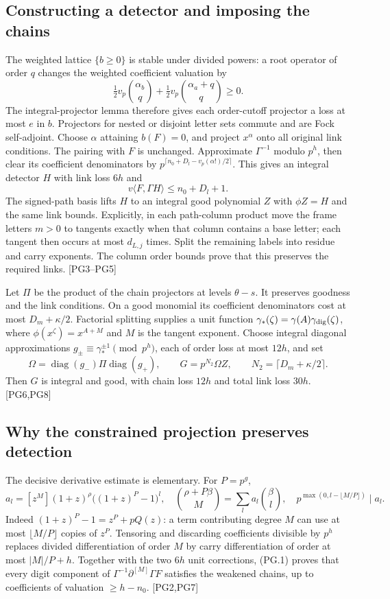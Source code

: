 \documentclass[11pt,a4paper]{article}
\numberwithin{equation}{section}
\theoremstyle{remark}\newtheorem{remark}[theorem]{Remark}
\begin{document}
\subsection{Constructing a detector and imposing the chains}

The weighted lattice $\{b\ge0\}$ is stable under divided powers: a root operator of order $q$ changes the weighted coefficient valuation by
\[
 \tfrac12v_p\binom{\alpha_b}{q}
 +\tfrac12v_p\binom{\alpha_a+q}{q}\ge0.
\]
The integral-projector lemma therefore gives each order-cutoff projector a loss at most $e$ in $b$. Projectors for nested or disjoint letter sets commute and are Fock self-adjoint. Choose $\alpha$ attaining $b(F)=0$, and project $x^\alpha$ onto all original link conditions. The pairing with $F$ is unchanged. Approximate $\Gamma^{-1}$ modulo $p^h$, then clear its coefficient denominators by $p^{\lceil n_0+D_l-v_p(\alpha!)/2\rceil}$. This gives an integral detector $H$ with link loss $6h$ and
\[
 v\langle F,\Gamma H\rangle\le n_0+D_l+1.
 \tag{PG.2}
\]
The signed-path basis lifts $H$ to an integral good polynomial $Z$ with $\phi Z=H$ and the same link bounds. Explicitly, in each path-column product move the frame letters $m>0$ to tangents exactly when that column contains a base letter; each tangent then occurs at most $d_{L,j}$ times. Split the remaining labels into residue and carry exponents. The column order bounds prove that this preserves the required links. \textsf{[PG3--PG5]}

Let $\Pi$ be the product of the chain projectors at levels $\theta-s$. It preserves goodness and the link conditions. On a good monomial its coefficient denominators cost at most $D_m+\kappa/2$. Factorial splitting supplies a unit function
$\gamma_*(\zeta)=\gamma(A)\gamma_{\rm dig}(\zeta)$, where $\phi(x^\zeta)=x^{A+M}$ and $M$ is the tangent exponent. Choose integral diagonal approximations $g_\pm\equiv\gamma_*^{\pm1}\pmod{p^h}$, each of order loss at most $12h$, and set
\[
 \Omega=\operatorname{diag}(g_-)\Pi\operatorname{diag}(g_+),
 \qquad G=p^{N_2}\Omega Z,\qquad N_2=\lceil D_m+\kappa/2\rceil.
 \tag{PG.3}
\]
Then $G$ is integral and good, with chain loss $12h$ and total link loss $30h$. \textsf{[PG6,PG8]}

\subsection{Why the constrained projection preserves detection}

The decisive derivative estimate is elementary. For $P=p^g$,
\[
 a_l=[z^M](1+z)^\rho\bigl((1+z)^P-1\bigr)^l,
 \quad
 \binom{\rho+P\beta}{M}=\sum_l a_l\binom\beta l,
 \quad p^{\max(0,l-\lfloor M/P\rfloor)}\mid a_l.
\]
Indeed $(1+z)^P-1=z^P+pQ(z)$: a term contributing degree $M$ can use at most $\lfloor M/P\rfloor$ copies of $z^P$. Tensoring and discarding coefficients divisible by $p^h$ replaces divided differentiation of order $M$ by carry differentiation of order at most $|M|/P+h$. Together with the two $6h$ unit corrections, (PG.1) proves that every digit component of $\Gamma^{-1}\partial^{[M]}\Gamma F$ satisfies the weakened chains, up to coefficients of valuation $\ge h-n_0$. \textsf{[PG2,PG7]}
\end{document}
